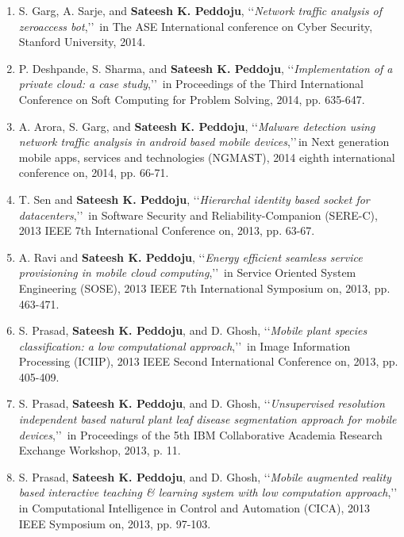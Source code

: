 \begin{enumerate}
	\item
	S. Garg, A. Sarje, and \textbf{Sateesh K. Peddoju}, \lq\lq \textit{Network traffic analysis of zeroaccess bot},\rq\rq\, in The ASE International conference on Cyber Security, Stanford University, 2014.
	
	\item
	P. Deshpande, S. Sharma, and \textbf{Sateesh K. Peddoju}, \lq\lq \textit{Implementation of a private cloud: a case study},\rq\rq\, in Proceedings of the Third International Conference on Soft Computing for Problem Solving, 2014, pp. 635-647.
	
	\item
	A. Arora, S. Garg, and \textbf{Sateesh K. Peddoju}, \lq\lq \textit{Malware detection using network traffic analysis in android based mobile devices},\rq\rq\,in Next generation mobile apps, services and technologies (NGMAST), 2014 eighth international conference on, 2014, pp. 66-71.
	
	\item
	T. Sen and \textbf{Sateesh K. Peddoju}, \lq\lq \textit{Hierarchal identity based socket for datacenters},\rq\rq\, in Software Security and Reliability-Companion (SERE-C), 2013 IEEE 7th International Conference on, 2013, pp. 63-67.
	
	\item
	A. Ravi and \textbf{Sateesh K. Peddoju}, \lq\lq \textit{Energy efficient seamless service provisioning in mobile cloud computing},\rq\rq\, in Service Oriented System Engineering (SOSE), 2013 IEEE 7th International Symposium on, 2013, pp. 463-471.
	
	\item
	S. Prasad, \textbf{Sateesh K. Peddoju}, and D. Ghosh, \lq\lq \textit{Mobile plant species classification: a low computational approach},\rq\rq\, in Image Information Processing (ICIIP), 2013 IEEE Second International Conference on, 2013, pp. 405-409.
	
	\item
	S. Prasad, \textbf{Sateesh K. Peddoju}, and D. Ghosh, \lq\lq \textit{Unsupervised resolution independent based natural plant leaf disease segmentation approach for mobile devices},\rq\rq\, in Proceedings of the 5th IBM Collaborative Academia Research Exchange Workshop, 2013, p. 11.
	
	\item
	S. Prasad, \textbf{Sateesh K. Peddoju}, and D. Ghosh, \lq\lq \textit{Mobile augmented reality based interactive teaching \& learning system with low computation approach},\rq\rq\, in Computational Intelligence in Control and Automation (CICA), 2013 IEEE Symposium on, 2013, pp. 97-103.
	

\end{enumerate}
